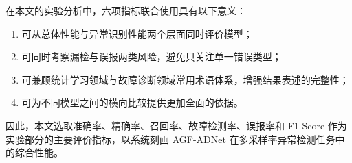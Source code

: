 在本文的实验分析中，六项指标联合使用具有以下意义：
\begin{enumerate}
    \item 可从总体性能与异常识别性能两个层面同时评价模型；
    \item 可同时考察漏检与误报两类风险，避免只关注单一错误类型；
    \item 可兼顾统计学习领域与故障诊断领域常用术语体系，增强结果表述的完整性；
    \item 可为不同模型之间的横向比较提供更加全面的依据。
\end{enumerate}

因此，本文选取准确率、精确率、召回率、故障检测率、误报率和 F1-Score 作为实验部分的主要评价指标，以系统刻画 AGF-ADNet 在多采样率异常检测任务中的综合性能。
